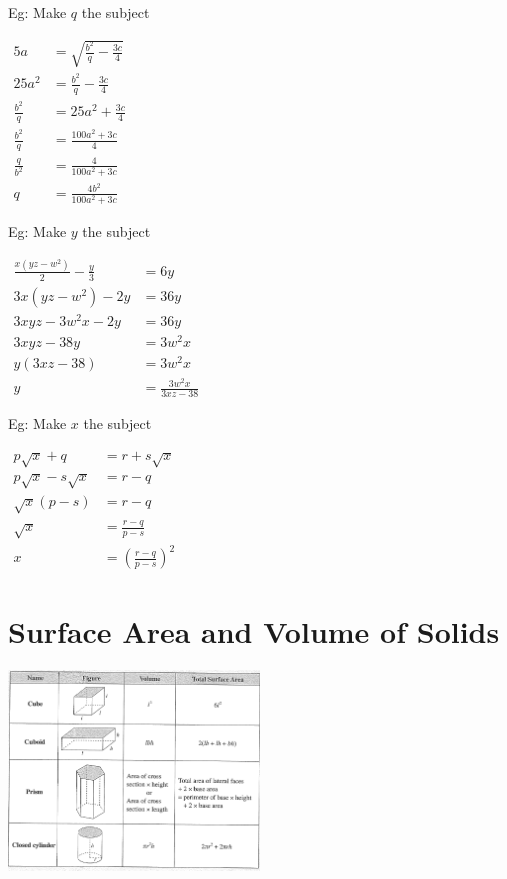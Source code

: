 \documentclass[twocolumn]{article}
\begin{document}
\bigskip 

\bigskip 

\bigskip 

\bigskip 

\bigskip 

\bigskip 

\bigskip 

\noindent 
Eg: Make $q$ the subject

\noindent 
$\begin{aligned} 5 a & =\sqrt{\frac{b^2}{q}-\frac{3 c}{4}} \\ 25 a^2 & =\frac{b^2}{q}-\frac{3 c}{4} \\ \frac{b^2}{q} & =25 a^2+\frac{3 c}{4} \\ \frac{b^2}{q} & =\frac{100 a^2+3 c}{4} \\ \frac{q}{b^2} & =\frac{4}{100 a^2+3 c} \\ q & =\frac{4 b^2}{100 a^2+3 c}\end{aligned}$

\bigskip 

\noindent 
Eg: Make $y$ the subject

\noindent 
$\begin{aligned} \frac{x\left(y z-w^2\right)}{2}-\frac{y}{3} & =6 y \\ 3 x\left(y z-w^2\right)-2 y & =36 y \\ 3 x y z-3 w^2 x-2 y & =36 y \\ 3 x y z-38 y & =3 w^2 x \\ y(3 x z-38) & =3 w^2 x \\ y & =\frac{3 w^2 x}{3 x z-38}\end{aligned}$

\bigskip 

\noindent 
Eg: Make $x$ the subject

\noindent 
$\begin{aligned} p \sqrt{x}+q & =r+s \sqrt{x} \\ p \sqrt{x}-s \sqrt{x} & =r-q \\ \sqrt{x}(p-s) & =r-q \\ \sqrt{x} & =\frac{r-q}{p-s} \\ x & =\left(\frac{r-q}{p-s}\right)^2\end{aligned}$


\section*{Surface Area and Volume of Solids}

\includegraphics[width=0.5\textwidth]{82.png}
\end{document}
